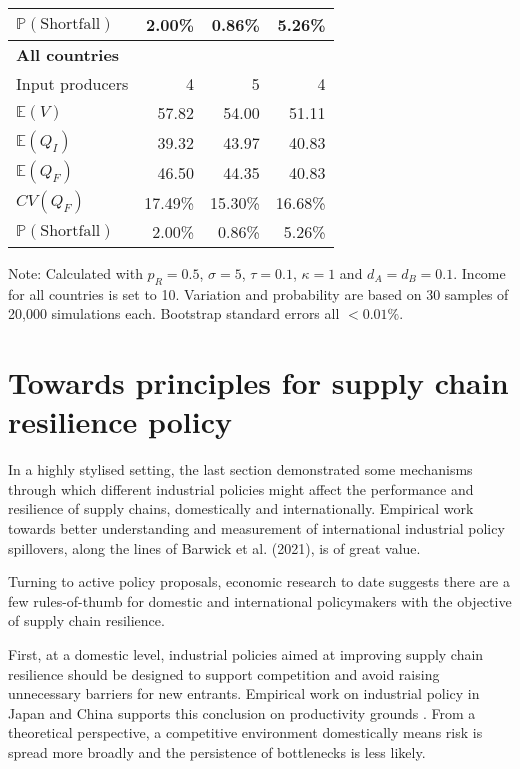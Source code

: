 \documentclass{article}
\begin{document}
\begin{table}
\begin{threeparttable}
\begin{tabular}{lrrr}
            $\mathbb{P}(\text{Shortfall})$ & 2.00\% & 0.86\% & 5.26\% \\ 
            \midrule
            \textbf{All countries} \\
            Input producers & 4 & 5 & 4 \\
            $\mathbb{E}(V)$ & 57.82 & 54.00 & 51.11 \\
            $\mathbb{E}(Q_I)$ & 39.32 & 43.97 & 40.83 \\
            $\mathbb{E}(Q_F)$ & 46.50 & 44.35 & 40.83 \\
            $CV(Q_F)$ & 17.49\% & 15.30\% & 16.68\% \\
            $\mathbb{P}(\text{Shortfall})$ & 2.00\% & 0.86\% & 5.26\% \\ 
            \bottomrule
        \end{tabular}
        \begin{tablenotes}
            \small \item Note: Calculated with $p_R = 0.5$, $\sigma = 5$, $\tau = 0.1$, $\kappa = 1$ and $d_A = d_B = 0.1$. Income for all countries is set to 10. Variation and probability are based on 30 samples of 20,000 simulations each. Bootstrap standard errors all $<0.01\%$.
        \end{tablenotes}
    \end{threeparttable}
\end{table}

\section{Towards principles for supply chain resilience policy}

In a highly stylised setting, the last section demonstrated some mechanisms through which different industrial policies might affect the performance and resilience of supply chains, domestically and internationally. Empirical work towards better understanding and measurement of international industrial policy spillovers, along the lines of Barwick et al. (2021), is of great value.

Turning to active policy proposals, economic research to date suggests there are a few rules-of-thumb for domestic and international policymakers with the objective of supply chain resilience.

First, at a domestic level, industrial policies aimed at improving supply chain resilience should be designed to support competition and avoid raising unnecessary barriers for new entrants. Empirical work on industrial policy in Japan and China supports this conclusion on productivity grounds \parencite{porter_competition_2004, aghion_industrial_2015}. From a theoretical perspective, a competitive environment domestically means risk is spread more broadly and the persistence of bottlenecks is less likely.
\end{document}

